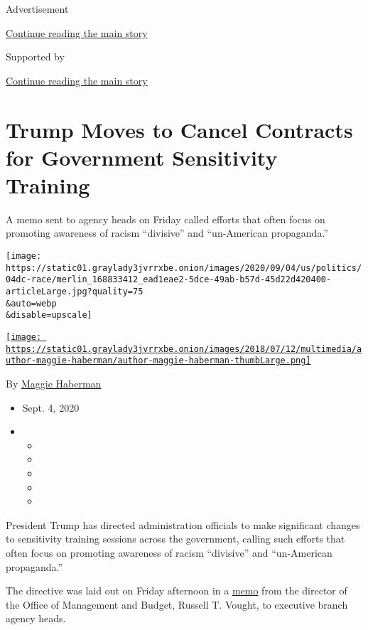 Advertisement

\protect\hyperlink{after-top}{Continue reading the main story}

Supported by

\protect\hyperlink{after-sponsor}{Continue reading the main story}

\hypertarget{trump-moves-to-cancel-contracts-for-government-sensitivity-training}{%
\section{Trump Moves to Cancel Contracts for Government Sensitivity
Training}\label{trump-moves-to-cancel-contracts-for-government-sensitivity-training}}

A memo sent to agency heads on Friday called efforts that often focus on
promoting awareness of racism ``divisive'' and ``un-American
propaganda.''

\texttt{[image: https://static01.graylady3jvrrxbe.onion/images/2020/09/04/us/politics/04dc-race/merlin\_168833412\_ead1eae2-5dce-49ab-b57d-45d22d420400-articleLarge.jpg?quality=75\\\&auto=webp\\\&disable=upscale]}

\href{https://www.nytimes3xbfgragh.onion/by/maggie-haberman}{\texttt{[image: https://static01.graylady3jvrrxbe.onion/images/2018/07/12/multimedia/author-maggie-haberman/author-maggie-haberman-thumbLarge.png]}}

By \href{https://www.nytimes3xbfgragh.onion/by/maggie-haberman}{Maggie
Haberman}

\begin{itemize}
\item
  Sept. 4, 2020
\item
  \begin{itemize}
  \item
  \item
  \item
  \item
  \item
  \end{itemize}
\end{itemize}

President Trump has directed administration officials to make
significant changes to sensitivity training sessions across the
government, calling such efforts that often focus on promoting awareness
of racism ``divisive'' and ``un-American propaganda.''

The directive was laid out on Friday afternoon in a
\href{https://www.whitehouse.gov/wp-content/uploads/2020/09/M-20-34.pdf}{memo}
from the director of the Office of Management and Budget, Russell T.
Vought, to executive branch agency heads.

